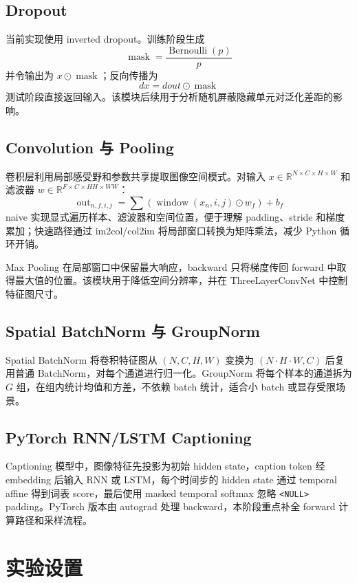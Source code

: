 \documentclass[UTF8]{ctexart}
\begin{document}
\subsection{Dropout}

当前实现使用 inverted dropout。训练阶段生成
\[
\operatorname{mask} = \frac{\operatorname{Bernoulli}(p)}{p}
\]
并令输出为 $x \odot \operatorname{mask}$；反向传播为
\[
dx = dout \odot \operatorname{mask}
\]
测试阶段直接返回输入。该模块后续用于分析随机屏蔽隐藏单元对泛化差距的影响。

\subsection{Convolution 与 Pooling}

卷积层利用局部感受野和参数共享提取图像空间模式。对输入 $x \in \mathbb{R}^{N \times C \times H \times W}$ 和滤波器 $w \in \mathbb{R}^{F \times C \times HH \times WW}$：
\[
\operatorname{out}_{n,f,i,j}
=
\sum
\left(
\operatorname{window}(x_n, i, j) \odot w_f
\right)
+ b_f
\]
naive 实现显式遍历样本、滤波器和空间位置，便于理解 padding、stride 和梯度累加；快速路径通过 im2col/col2im 将局部窗口转换为矩阵乘法，减少 Python 循环开销。

Max Pooling 在局部窗口中保留最大响应，backward 只将梯度传回 forward 中取得最大值的位置。该模块用于降低空间分辨率，并在 ThreeLayerConvNet 中控制特征图尺寸。

\subsection{Spatial BatchNorm 与 GroupNorm}

Spatial BatchNorm 将卷积特征图从 $(N,C,H,W)$ 变换为 $(N \cdot H \cdot W,C)$ 后复用普通 BatchNorm，对每个通道进行归一化。GroupNorm 将每个样本的通道拆为 $G$ 组，在组内统计均值和方差，不依赖 batch 统计，适合小 batch 或显存受限场景。

\subsection{PyTorch RNN/LSTM Captioning}

Captioning 模型中，图像特征先投影为初始 hidden state，caption token 经 embedding 后输入 RNN 或 LSTM，每个时间步的 hidden state 通过 temporal affine 得到词表 score，最后使用 masked temporal softmax 忽略 \texttt{<NULL>} padding。PyTorch 版本由 autograd 处理 backward，本阶段重点补全 forward 计算路径和采样流程。

\section{实验设置}
\end{document}
